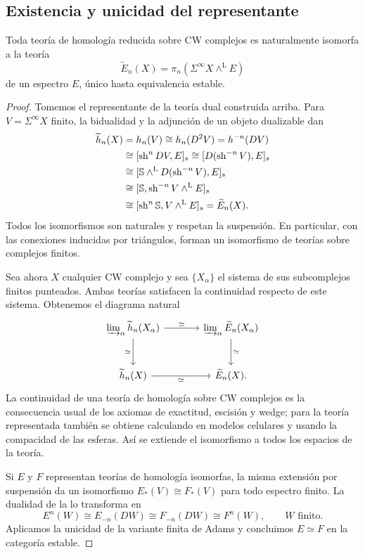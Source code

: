 \subsection{Existencia y unicidad del representante}
\begin{teo}\label{teo:c20-whitehead}
Toda teoría de homología reducida sobre CW complejos es naturalmente isomorfa a la teoría
\[
\widetilde E_n(X)=\pi_n(\Sigma^\infty X\wedge^{\mathrm L}E)
\]
de un espectro $E$, único hasta equivalencia estable.
\end{teo}
\begin{proof}
Tomemos el representante de la teoría dual construida arriba. Para $V=\Sigma^\infty X$ finito, la bidualidad y la adjunción de un objeto dualizable dan
\[
\begin{aligned}
\widetilde h_n(X)&=h_n(V)\cong h_n(D^2V)=h^{-n}(DV)\\
&\cong[\operatorname{sh}^nDV,E]_s
\cong[D(\operatorname{sh}^{-n}V),E]_s\\
&\cong[\mathbb S\wedge^{\mathrm L}D(\operatorname{sh}^{-n}V),E]_s\\
&\cong[\mathbb S,\operatorname{sh}^{-n}V\wedge^{\mathrm L}E]_s\\
&\cong[\operatorname{sh}^n\mathbb S,V\wedge^{\mathrm L}E]_s
=\widetilde E_n(X).
\end{aligned}
\]
Todos los isomorfismos son naturales y respetan la suspensión. En particular, con las conexiones inducidas por triángulos, forman un isomorfismo de teorías sobre complejos finitos.

Sea ahora $X$ cualquier CW complejo y sea $\{X_\alpha\}$ el sistema de sus subcomplejos finitos punteados. Ambas teorías satisfacen la continuidad respecto de este sistema. Obtenemos el diagrama natural
\[
\begin{tikzcd}[column sep=large,row sep=large]
\displaystyle\varinjlim\nolimits_\alpha\widetilde h_n(X_\alpha)
\arrow[r,"\simeq"]\arrow[d,"\simeq"']
&\displaystyle\varinjlim\nolimits_\alpha\widetilde E_n(X_\alpha)
\arrow[d,"\simeq"]\\
\widetilde h_n(X)\arrow[r,"\simeq"']&\widetilde E_n(X).
\end{tikzcd}
\]
La continuidad de una teoría de homología sobre CW complejos es la consecuencia usual de los axiomas de exactitud, escisión y wedge; para la teoría representada también se obtiene calculando en modelos celulares y usando la compacidad de las esferas. Así se extiende el isomorfismo a todos los espacios de la teoría.

Si $E$ y $F$ representan teorías de homología isomorfas, la misma extensión por suspensión da un isomorfismo $E_*(V)\cong F_*(V)$ para todo espectro finito. La dualidad de la  lo transforma en
\[
E^n(W)\cong E_{-n}(DW)
\cong F_{-n}(DW)\cong F^n(W),
\qquad W\text{ finito}.
\]
Aplicamos la unicidad de la variante finita de Adams y concluimos $E\simeq F$ en la categoría estable.
\end{proof}

